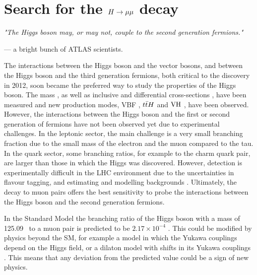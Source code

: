 \chapter{Search for the $H \rightarrow \mu\mu$ decay}

\textit{"The Higgs boson may, or may not, couple to the second generation fermions."}

\vspace{5mm}
\begin{flushright}
--- a bright bunch of ATLAS scientists.
\end{flushright}

\thispagestyle{empty}
\newpage

The interactions between the Higgs boson and the vector bosons, and between the Higgs boson and the
third generation fermions, both critical to the discovery in 2012, soon 
became the preferred way to study the properties of the Higgs boson.
The mass \cite{Aad:2015zhl, Aaboud:2018wps, CMS-PAS-HIG-19-004},
as well as inclusive and differential cross-sections
\cite{Aad_2015, Chatrchyan_2014, Aaboud:2017oem, Sirunyan:2018sgc, Aaboud:2018ezd},
have been measured and new production modes, VBF \cite{Khachatryan:2016vau, Aad:2019mbh},
$t\bar{t} H$ \cite{Sirunyan:2018hoz, Aaboud:2018urx}
and $\text{VH}$ \cite{Sirunyan:2018kst, Aaboud:2018zhk}, have been 
observed. However, the interactions between the Higgs boson
and the first or second generation of fermions have not been
observed yet due to experimental challenges. In the leptonic
sector, the main challenge is a very small branching fraction due
to the small mass of the electron and the muon compared to the tau.
In the quark sector, some branching ratios, for example to the charm
quark pair, are larger than those in which the Higgs was discovered.
However, detection is experimentally difficult in the LHC environment
due to the uncertainties in flavour tagging, and estimating and modelling
backgrounds \cite{Aaboud:2018fhh, CMS-PAS-HIG-18-031}. Ultimately, the
decay to muon pairs offers the best sensitivity to probe the
interactions between the Higgs boson and the second generation
fermions.

In the Standard Model the branching ratio of the Higgs boson with a
mass of 125.09 \GeV~to a muon pair is predicted to be $2.17 \times 10^{-4}$
\cite{deFlorian:2016spz}. This could be modified by physics beyond the
SM, for example a model in which the Yukawa couplings depend on the Higgs field,
or a dilaton model with shifts in its Yukawa couplings \cite{Giudice:2008uua, Dery:2013rta, PhysRevD.80.095023}.
This means that any deviation from the predicted value could be a sign of new
physics.

